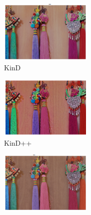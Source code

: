 \documentclass[letterpaper,12pt]{article}
\begin{document}
\begin{figure}[htbp]
\begin{subfigure}{0.18\textwidth}
			\includegraphics[width=\linewidth]{LOL-test_dataset/KinD}
			\captionsetup{font=scriptsize}
			\caption{KinD}
			\label{fig: LOL-test_f}  
		\end{subfigure}    
		\begin{subfigure}{0.18\textwidth}
			\includegraphics[width=\linewidth]{LOL-test_dataset/KinD++}
			\captionsetup{font=scriptsize}
			\caption{KinD++}
			\label{fig: LOL-test_g}
		\end{subfigure}
		\begin{subfigure}{0.18\textwidth}
			\includegraphics[width=\linewidth]{LOL-test_dataset/TBEFN}

\end{subfigure}
\end{figure}
\end{document}
